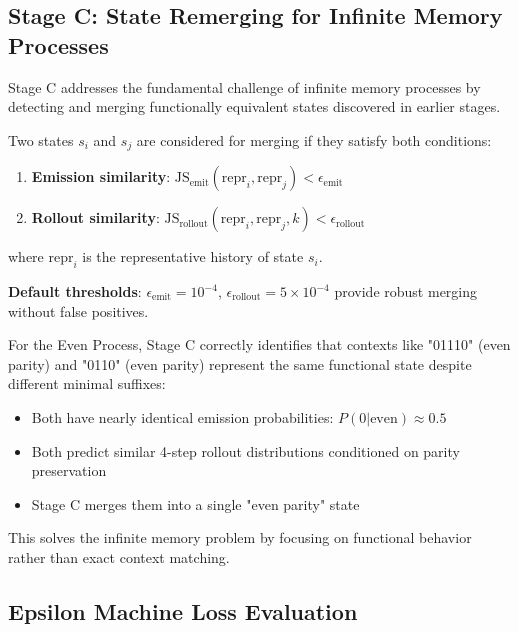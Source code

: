 \documentclass[11pt]{article}
\begin{document}
\subsection{Stage C: State Remerging for Infinite Memory Processes}

Stage C addresses the fundamental challenge of infinite memory processes by detecting and merging functionally equivalent states discovered in earlier stages.

\begin{resultbox}
Two states $s_i$ and $s_j$ are considered for merging if they satisfy both conditions:

\begin{enumerate}
\item \textbf{Emission similarity}: $\text{JS}_{\text{emit}}(\text{repr}_i, \text{repr}_j) < \epsilon_{\text{emit}}$
\item \textbf{Rollout similarity}: $\text{JS}_{\text{rollout}}(\text{repr}_i, \text{repr}_j, k) < \epsilon_{\text{rollout}}$
\end{enumerate}

where $\text{repr}_i$ is the representative history of state $s_i$.

\textbf{Default thresholds}: $\epsilon_{\text{emit}} = 10^{-4}$, $\epsilon_{\text{rollout}} = 5 \times 10^{-4}$ provide robust merging without false positives.
\end{resultbox}

\begin{notebox}
For the Even Process, Stage C correctly identifies that contexts like "01110" (even parity) and "0110" (even parity) represent the same functional state despite different minimal suffixes:

\begin{itemize}
\item Both have nearly identical emission probabilities: $P(0|\text{even}) \approx 0.5$
\item Both predict similar 4-step rollout distributions conditioned on parity preservation
\item Stage C merges them into a single "even parity" state
\end{itemize}

This solves the infinite memory problem by focusing on functional behavior rather than exact context matching.
\end{notebox}

\subsection{Epsilon Machine Loss Evaluation}
\end{document}
